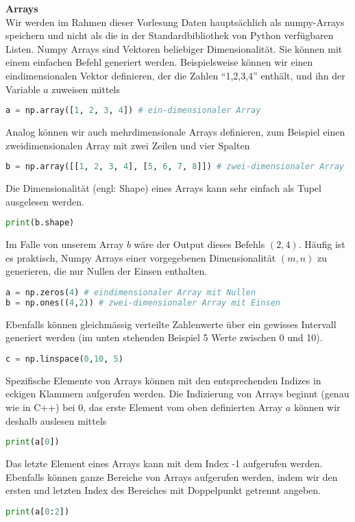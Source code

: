 \textbf{Arrays} \\
Wir werden im Rahmen dieser Vorlesung Daten hauptsächlich als numpy-Arrays speichern und nicht als die in der Standardbibliothek von Python verfügbaren Listen. Numpy Arrays sind Vektoren beliebiger Dimensionalität. Sie können mit einem einfachen Befehl generiert werden. Beispielsweise können wir einen eindimensionalen Vektor definieren, der die Zahlen ``1,2,3,4'' enthält, und ihn der Variable $a$ zuweisen mittels
\begin{lstlisting}[language = Python]
a = np.array([1, 2, 3, 4]) # ein-dimensionaler Array
\end{lstlisting}  
Analog können wir auch mehrdimensionale Arrays definieren, zum  Beispiel einen zweidimensionalen Array mit zwei Zeilen und vier Spalten 
\begin{lstlisting}[language = Python]
b = np.array([[1, 2, 3, 4], [5, 6, 7, 8]]) # zwei-dimensionaler Array
\end{lstlisting}  
Die Dimensionalität (engl: Shape) eines Arrays kann sehr einfach als Tupel ausgelesen werden. \begin{lstlisting}[language = Python]
print(b.shape)
\end{lstlisting}
Im Falle von unserem Array $b$ wäre der Output dieses Befehls  $(2,4)$. Häufig ist es praktisch, Numpy Arrays einer vorgegebenen Dimensionalität $(m,n)$ zu generieren, die nur Nullen der Einsen enthalten. 
\begin{lstlisting}[language = Python]
a = np.zeros(4) # eindimensionaler Array mit Nullen
b = np.ones((4,2)) # zwei-dimensionaler Array mit Einsen
\end{lstlisting}
Ebenfalls können gleichmässig verteilte Zahlenwerte über ein gewisses Intervall generiert werden (im unten stehenden Beispiel 5 Werte zwischen 0 und 10).  
\begin{lstlisting}[language = Python]
c = np.linspace(0,10, 5)
\end{lstlisting}
Spezifische Elemente von Arrays können mit den entsprechenden Indizes in eckigen Klammern aufgerufen werden. Die Indizierung von Arrays beginnt (genau wie in C++) bei 0, das erste Element vom oben definierten Array $a$ können wir deshalb auslesen mittels
\begin{lstlisting}[language = Python]
print(a[0])
\end{lstlisting}
Das letzte Element eines Arrays kann mit dem Index -1 aufgerufen werden.
Ebenfalls können ganze Bereiche von Arrays aufgerufen werden, indem wir den ersten und letzten Index des Bereiches mit Doppelpunkt getrennt angeben.
\begin{lstlisting}[language = Python]
print(a[0:2])
\end{lstlisting} 


